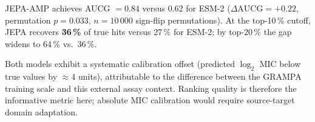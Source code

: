 JEPA-AMP achieves AUCG $= 0.84$ versus $0.62$ for ESM-2
($\Delta\text{AUCG} = +0.22$, permutation $p = 0.033$, $n = 10\,000$
sign-flip permutations).
At the top-10\,\% cutoff, JEPA recovers \textbf{36\,\%} of true hits versus
27\,\% for ESM-2; by top-20\,\% the gap widens to 64\,\% vs.\ 36\,\%.

Both models exhibit a systematic calibration offset (predicted $\log_2$ MIC
below true values by $\approx 4$ units), attributable to the difference between
the GRAMPA training scale and this external assay context.
Ranking quality is therefore the informative metric here; absolute MIC
calibration would require source-target domain adaptation.

